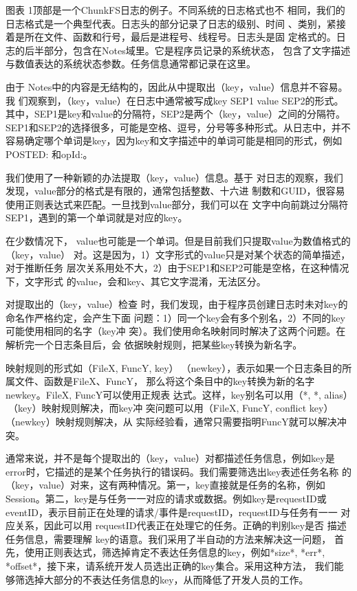 图表 1顶部是一个ChunkFS日志的例子。不同系统的日志格式也不
相同，我们的日志格式是一个典型代表。日志头的部分记录了日志的级别、时间
、类别，紧接着是所在文件、函数和行号，最后是进程号、线程号。日志头是固
定格式的。日志的后半部分，包含在Notes域里。它是程序员记录的系统状态，
包含了文字描述与数值表达的系统状态参数。任务信息通常都记录在这里。

由于
Notes中的内容是无结构的，因此从中提取出（key，value）信息并不容易。我
们观察到，（key，value）在日志中通常被写成key SEP1 value SEP2的形式。
其中，SEP1是key和value的分隔符，SEP2是两个（key，value）之间的分隔符。
SEP1和SEP2的选择很多，可能是空格、逗号，分号等多种形式。从日志中，并不
容易确定哪个单词是key，因为key和文字描述中的单词可能是相同的形式，例如
POSTED: 和opId:。

我们使用了一种新颖的办法提取（key，value）信息。基于
对日志的观察，我们发现，value部分的格式是有限的，通常包括整数、十六进
制数和GUID，很容易使用正则表达式来匹配。一旦找到value部分，我们可以在
文字中向前跳过分隔符SEP1，遇到的第一个单词就是对应的key。

在少数情况下，
value也可能是一个单词。但是目前我们只提取value为数值格式的（key，value）
对。这是因为，1）文字形式的value只是对某个状态的简单描述，对于推断任务
层次关系用处不大，2）由于SEP1和SEP2可能是空格，在这种情况下，文字形式
的value，会和key、其它文字混淆，无法区分。

对提取出的（key，value）检查
时，我们发现，由于程序员创建日志时未对key的命名作严格约定，会产生下面
问题：1）同一个key会有多个别名，2）不同的key可能使用相同的名字（key冲
突）。我们使用命名映射同时解决了这两个问题。在解析完一个日志条目后，会
依据映射规则，把某些key转换为新名字。

映射规则的形式如（FileX, FuncY,
key）（newkey），表示如果一个日志条目的所属文件、函数是FileX、FuncY，
那么将这个条目中的key转换为新的名字newkey。FileX, FuncY可以使用正规表
达式。这样，key别名可以用（*, *, alias）（key）映射规则解决，而key冲
突问题可以用（FileX, FuncY, conflict key）（newkey）映射规则解决，从
实际经验看，通常只需要指明FuncY就可以解决冲突。

通常来说，并不是每个提取出的（key，value）对都描述任务信息，例如key是
error时，它描述的是某个任务执行的错误码。我们需要筛选出key表述任务名称
的（key，value）对来，这有两种情况。第一，key直接就是任务的名称，例如
Session。第二，key是与任务一一对应的请求或数据。例如key是requestID或
eventID，表示目前正在处理的请求/事件是requestID，requestID与任务有一一
对应关系，因此可以用 requestID代表正在处理它的任务。正确的判别key是否
描述任务信息，需要理解 key的语意。我们采用了半自动的方法来解决这一问题，
首先，使用正则表达式，筛选掉肯定不表达任务信息的key，例如*size*,
*err*, *offset*，接下来，请系统开发人员选出正确的key集合。采用这种方法，
我们能够筛选掉大部分的不表达任务信息的key，从而降低了开发人员的工作。

